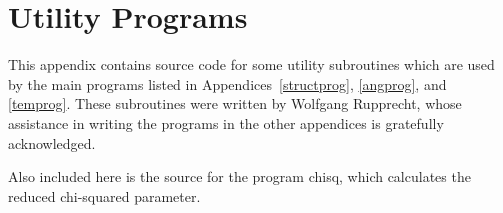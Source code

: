 \chapter{Utility Programs}
\label{utility}
\pagestyle{headings}

        This appendix  contains source  code  for some  utility subroutines
which are used by the main  programs listed in Appendices~\ref{structprog},
\ref{angprog}, and \ref{temprog}.    These subroutines were written by 
Wolfgang Rupprecht, whose assistance in  writing the  programs in the other
appendices is gratefully acknowledged.

        Also included  here is  the source for   the program chisq,   which
calculates the reduced chi-squared parameter.

